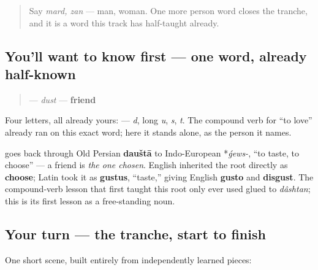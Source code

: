 \label{lesson:FA-C14-dust}



\begin{quote}
Say \emph{mard, zan} — man, woman. One more person word closes the tranche, and it is a word this track has half-taught already.
\end{quote}

\subsection*{You'll want to know first — one word, already half-known}
\begin{quote}
\textbf{} — \emph{dust} — \textbf{friend}
\end{quote}

Four letters, all already yours: \textbf{   } — \emph{d}, long \emph{u}, \emph{s}, \emph{t}. The compound verb for \textquotedblleft{}to love\textquotedblright{} already ran on this exact word; here it stands alone, as the person it names.

\begin{cousinweb}
\textbf{} goes back through Old Persian \textbf{dauštā} to Indo-European *\emph{ǵews-}, \textquotedblleft{}to taste, to choose\textquotedblright{} — a friend is \emph{the one chosen}. English inherited the root directly as \textbf{choose}; Latin took it as \textbf{gustus}, \textquotedblleft{}taste,\textquotedblright{} giving English \textbf{gusto} and \textbf{disgust}. The compound-verb lesson that first taught this root only ever used \textbf{} glued to \emph{dâshtan}; this is its first lesson as a free-standing noun.
\end{cousinweb}

\subsection*{Your turn — the tranche, start to finish}
One short scene, built entirely from independently learned pieces:

